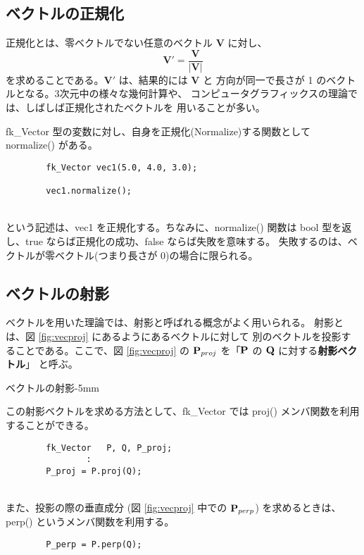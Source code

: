 \subsection{ベクトルの正規化}
正規化とは、零ベクトルでない任意のベクトル \(\mathbf{V}\) に対し、
\[
	\mathbf{V}' = \frac{\mathbf{V}}{|\mathbf{V}|}
\]
を求めることである。\(\mathbf{V}'\) は、結果的には \(\mathbf{V}\) と
方向が同一で長さが 1 のベクトルとなる。3次元中の様々な幾何計算や、
コンピュータグラフィックスの理論では、しばしば正規化されたベクトルを
用いることが多い。

fk\_Vector 型の変数に対し、自身を正規化(Normalize)する関数として
normalize() がある。
\\
\begin{screen}
\begin{verbatim}
        fk_Vector vec1(5.0, 4.0, 3.0);

        vec1.normalize();
\end{verbatim}
\end{screen}
~ \\
という記述は、vec1 を正規化する。ちなみに、normalize() 関数は
bool 型を返し、true ならば正規化の成功、false ならば失敗を意味する。
失敗するのは、ベクトルが零ベクトル(つまり長さが 0)の場合に限られる。

\subsection{ベクトルの射影}
ベクトルを用いた理論では、射影と呼ばれる概念がよく用いられる。
射影とは、図 \ref{fig:vecproj} にあるようにあるベクトルに対して
別のベクトルを投影することである。ここで、図 \ref{fig:vecproj}
の \(\mathbf{P}_{proj}\) を「\(\mathbf{P}\) の \(\mathbf{Q}\) に対する\textbf{射影ベクトル}」
と呼ぶ。

	{ベクトルの射影}{-5mm}

この射影ベクトルを求める方法として、fk\_Vector では
proj() メンバ関数を利用することができる。
\\
\begin{screen}
\begin{verbatim}
        fk_Vector   P, Q, P_proj;
                :
        P_proj = P.proj(Q);
\end{verbatim}
\end{screen}
~ \\	
また、投影の際の垂直成分 (図 \ref{fig:vecproj} 中での \(\mathbf{P}_{perp}\))
を求めるときは、perp() というメンバ関数を利用する。
\\
\begin{screen}
\begin{verbatim}
        P_perp = P.perp(Q);
\end{verbatim}
\end{screen}
